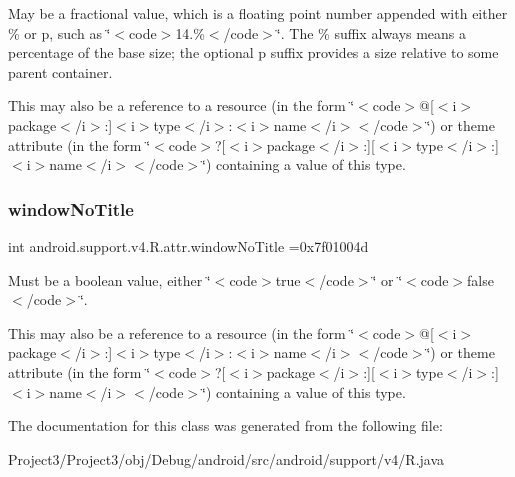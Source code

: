 May be a fractional value, which is a floating point number appended with either \% or p, such as \char`\"{}$<$code$>$14.\%$<$/code$>$\char`\"{}. The \% suffix always means a percentage of the base size; the optional p suffix provides a size relative to some parent container. 

This may also be a reference to a resource (in the form \char`\"{}$<$code$>$@\mbox{[}$<$i$>$package$<$/i$>$\+:\mbox{]}$<$i$>$type$<$/i$>$\+:$<$i$>$name$<$/i$>$$<$/code$>$\char`\"{}) or theme attribute (in the form \char`\"{}$<$code$>$?\mbox{[}$<$i$>$package$<$/i$>$\+:\mbox{]}\mbox{[}$<$i$>$type$<$/i$>$\+:\mbox{]}$<$i$>$name$<$/i$>$$<$/code$>$\char`\"{}) containing a value of this type. \mbox{\label{classandroid_1_1support_1_1v4_1_1R_1_1attr_a1f9a8ba450a55992fbdcd19844780477}} 
\subsubsection{\texorpdfstring{window\+No\+Title}{windowNoTitle}}
{\footnotesize\ttfamily int android.\+support.\+v4.\+R.\+attr.\+window\+No\+Title =0x7f01004d\hspace{0.3cm}{\ttfamily [static]}}

Must be a boolean value, either \char`\"{}$<$code$>$true$<$/code$>$\char`\"{} or \char`\"{}$<$code$>$false$<$/code$>$\char`\"{}. 

This may also be a reference to a resource (in the form \char`\"{}$<$code$>$@\mbox{[}$<$i$>$package$<$/i$>$\+:\mbox{]}$<$i$>$type$<$/i$>$\+:$<$i$>$name$<$/i$>$$<$/code$>$\char`\"{}) or theme attribute (in the form \char`\"{}$<$code$>$?\mbox{[}$<$i$>$package$<$/i$>$\+:\mbox{]}\mbox{[}$<$i$>$type$<$/i$>$\+:\mbox{]}$<$i$>$name$<$/i$>$$<$/code$>$\char`\"{}) containing a value of this type. 

The documentation for this class was generated from the following file\+:\begin{DoxyCompactItemize}
\item 
Project3/\+Project3/obj/\+Debug/android/src/android/support/v4/R.\+java\end{DoxyCompactItemize}
